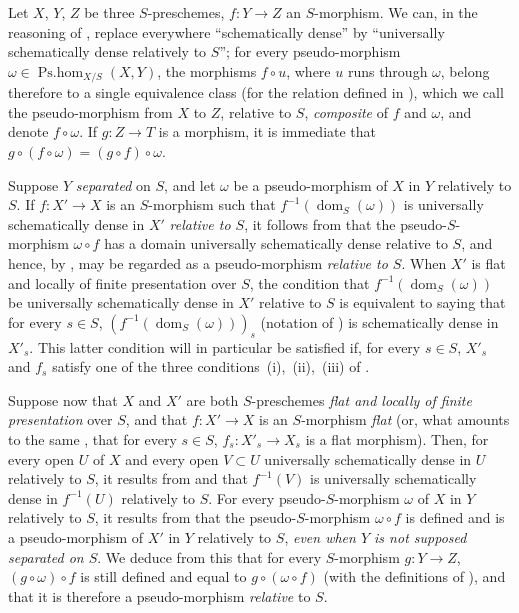 \begin{env}[20.5.5]
\label{IV.20.5.5}
Let $X$, $Y$, $Z$ be three $S$-preschemes, $f:Y\to Z$ an $S$-morphism.
We can, in the reasoning of , replace everywhere ``schematically dense'' by ``universally schematically dense relatively to $S$'';
for every pseudo-morphism $\omega\in\operatorname{Ps.hom}_{X/S}(X,Y)$, the morphisms $f\circ u$, where $u$ runs through $\omega$, belong therefore to a single equivalence class (for the relation defined in ), which we call the pseudo-morphism from $X$ to $Z$, relative to $S$, \emph{composite} of $f$ and $\omega$, and denote $f\circ\omega$.
If $g:Z\to T$ is a morphism, it is immediate that $g\circ(f\circ\omega)=(g\circ f)\circ\omega$.
\end{env}

\begin{env}[20.5.6]
\label{IV.20.5.6}
Suppose $Y$ \emph{separated} on $S$, and let $\omega$ be a pseudo-morphism of $X$ in $Y$ relatively to $S$.
If $f:X'\to X$ is an $S$-morphism such that $f^{-1}(\operatorname{dom}_S(\omega))$ is universally schematically dense in $X'$ \emph{relative to $S$}, it follows from  that the pseudo-$S$-morphism $\omega\circ f$ has a domain universally schematically dense relative to $S$, and hence, by , may be regarded as a pseudo-morphism \emph{relative to $S$}.
When $X'$ is flat and locally of finite presentation over $S$, the condition that $f^{-1}(\operatorname{dom}_S(\omega))$ be universally schematically dense in $X'$ relative to $S$ is equivalent to saying that for every $s\in S$, $(f^{-1}(\operatorname{dom}_S(\omega)))_s$ (notation of ) is schematically dense in $X'_s$.
This latter condition will in particular be satisfied if, for every $s\in S$, $X'_s$ and $f_s$ satisfy one of the three conditions~(i),~(ii),~(iii) of .
\end{env}

\begin{env}[20.5.7]
\label{IV.20.5.7}
Suppose now that $X$ and $X'$ are both $S$-preschemes \emph{flat and locally of finite presentation} over $S$, and that $f:X'\to X$ is an $S$-morphism \emph{flat} (or, what amounts to the same , that for every $s\in S$, $f_s:X'_s\to X_s$ is a flat morphism).
Then, for every open $U$ of $X$ and every open $V\subset U$ universally schematically dense in $U$ relatively to $S$, it results from  and  that $f^{-1}(V)$ is universally schematically dense in $f^{-1}(U)$ relatively to $S$.
For every pseudo-$S$-morphism $\omega$ of $X$ in $Y$ relatively to $S$, it results from  that the pseudo-$S$-morphism $\omega\circ f$ is defined and is a pseudo-morphism of $X'$ in $Y$ relatively to $S$, \emph{even when $Y$ is not supposed separated on $S$}.
We deduce from this that for every $S$-morphism $g:Y\to Z$, $(g\circ\omega)\circ f$ is still defined and equal to $g\circ(\omega\circ f)$ (with the definitions of ), and that it is therefore a pseudo-morphism \emph{relative} to $S$.
\end{env}

